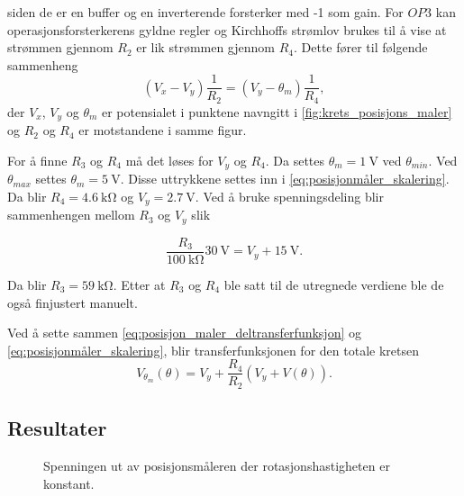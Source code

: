 siden de er en buffer og en inverterende forsterker med -1 som gain.
For $OP3$ kan operasjonsforsterkerens gyldne regler og Kirchhoffs strømlov brukes til å vise at strømmen gjennom $R_2$ er lik strømmen gjennom $R_4$. Dette fører til følgende sammenheng
\begin{equation}
    \label{eq:posisjonmåler_skalering}
    (V_x - V_y) \frac{1}{R_2} = (V_y - \theta_m) \frac{1}{R_4},
\end{equation}
der $V_x$, $V_y$ og $\theta_m$ er potensialet i punktene navngitt i \autoref{fig:krets_posisjons_maler} og $R_2$ og $R_4$ er motstandene i samme figur.

For å finne $R_3$ og $R_4$ må det løses for $V_y$ og $R_4$.
Da settes $\theta_m = \SI{1}{\volt}$ ved $\theta_{min}$.
Ved $\theta_{max}$ settes $\theta_m = \SI{5}{\volt}$.
Disse uttrykkene settes inn i \eqref{eq:posisjonmåler_skalering}. 
Da blir $R_4 = \SI{4.6}{\kilo\ohm}$ og 
$V_y = \SI{2.7}{\volt}$.
Ved å bruke spenningsdeling blir sammenhengen mellom $R_3$ og $V_y$ slik

\begin{equation}
    \label{eq:posisjon_maler_R3}
    \frac{R_3}{\SI{100}{\kilo\ohm}} \SI{30}{\volt} = V_y + \SI{15}{\volt}.
\end{equation}

Da blir $R_3 = \SI{59}{\kilo\ohm}$. Etter at $R_3$ og $R_4$ ble satt til de utregnede verdiene ble de også finjustert manuelt.

Ved å sette sammen \eqref{eq:posisjon_maler_deltransferfunksjon} og \eqref{eq:posisjonmåler_skalering}, blir transferfunksjonen for den totale kretsen
\begin{equation}
    \label{eq:posisjon_maling_transferfuksjon}
    V_{\theta_m}(\theta) = V_y + \frac{R_4}{R_2}(V_y + V(\theta)).
\end{equation}







\subsection{Resultater}

\begin{figure}[h]
    \centering
    
    \caption{Spenningen ut av posisjonsmåleren der rotasjonshastigheten er konstant.}
    \label{fig:posisjon_sagtann}
\end{figure}

